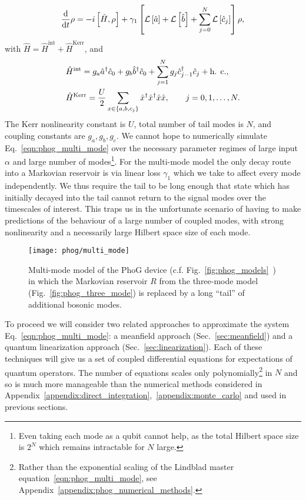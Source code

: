 \begin{equation}\label{eqn:phog_multi_mode}
\frac{\mathrm{d}}{\mathrm{d}t} \rho = - i \left[\hat{H}, \rho\right] + \gamma_1 \left[\mathcal{L}\left[\hat{a}\right] + \mathcal{L}\left[\hat{b}\right] + \sum_{j=0}^N \mathcal{L}\left[\hat{c}_j\right] \right] \rho,
\end{equation}
with $\hat{H} = \hat{H}^{\text{int}} + \hat{H}^{\text{Kerr}}$, and
\begin{align}
&\hat{H}^{\text{int}} = g_a \hat{a}^\dagger \hat{c}_0 + g_b \hat{b}^\dagger \hat{c}_0 + \sum_{j=1}^N g_j \hat{c}_{j-1}^\dagger \hat{c}_j + \hc, \notag \\
%
&\hat{H}^{\text{Kerr}} = \frac{U}{2} \sum_{x \in \left\{a, b, c_j\right\}} \hat{x}^\dagger \hat{x}^\dagger \hat{x} \hat{x}, \qq{} j = 0, 1, \dots, N.
\end{align}
The Kerr nonlinearity constant is $U$, total number of tail modes is $N$, and coupling constants are $g_a, g_b, g_c$. We cannot hope to numerically simulate Eq.~\ref{eqn:phog_multi_mode} over the necessary parameter regimes of large input $\alpha$ and large number of modes\footnote{Even taking each mode as a qubit cannot help, as the total Hilbert space size is $2^{N}$ which remains intractable for $N$ large.}. For the multi-mode model the only decay route into a Markovian reservoir is via linear loss $\gamma_1$ which we take to affect every mode independently. We thus require the tail to be long enough that state which has initially decayed into the tail cannot return to the signal modes over the timescales of interest. This traps us in the unfortunate scenario of having to make predictions of the behaviour of a large number of coupled modes, with strong nonlinearity and a necessarily large Hilbert space size of each mode. 

\begin{figure}[htp]
\captionsetup{width=\linewidth}
\centering
\texttt{[image: phog/multi\_mode]}
\caption{\label{fig:phog_multi_mode} Multi-mode model of the PhoG device (c.f. Fig.~\ref{fig:phog_models}~\MakeUppercase{}) in which the Markovian reservoir $R$ from the three-mode model (Fig.~\ref{fig:phog_three_mode}) is replaced by a long ``tail'' of additional bosonic modes.}
\end{figure}

To proceed we will consider two related approaches to approximate the system Eq.~\ref{eqn:phog_multi_mode}: a meanfield approach (Sec.~\ref{sec:meanfield}) and a quantum linearization approach (Sec.~\ref{sec:linearization}). Each of these techniques will give us a set of coupled differential equations for expectations of quantum operators. The number of equations scales only polynomially\footnote{Rather than the exponential scaling of the Lindblad master equation~\ref{eqn:phog_multi_mode}, see Appendix~\ref{appendix:phog_numerical_methods}.} in $N$ and so is much more manageable than the numerical methods considered in Appendix~\ref{appendix:direct_integration},~\ref{appendix:monte_carlo} and used in previous sections.

